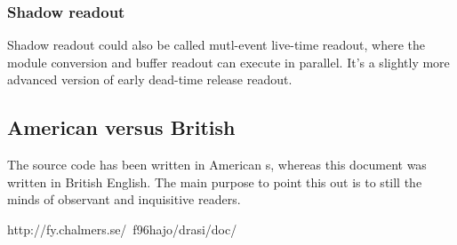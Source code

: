 \documentclass{article}
\begin{document}
\subsubsection{Shadow readout}

Shadow readout could also be called mutl-event live-time readout, where the
module conversion and buffer readout can execute in parallel. It's a slightly
more advanced version of early dead-time release readout.

\subsection{American versus British}

The source code has been written in American s,
whereas this document was written in British English. The main purpose to
point this out is to still the minds of observant and inquisitive readers.



\begin{thebibliography}{100}
 http://fy.chalmers.se/~f96hajo/drasi/doc/
\end{thebibliography}
\end{document}
